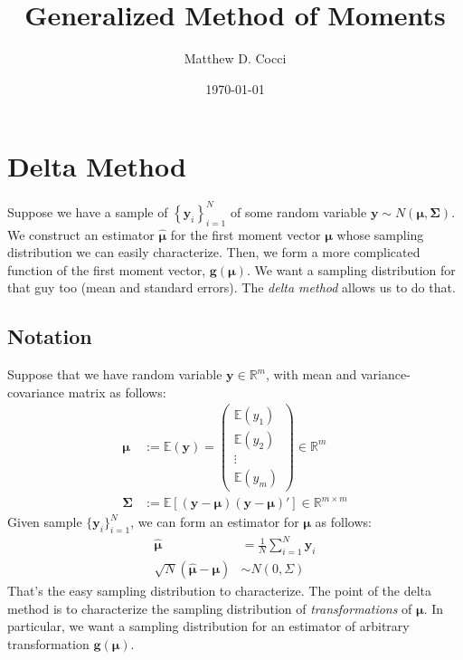 \documentclass[12pt]{article}
\author{Matthew D. Cocci}
\title{Generalized Method of Moments}
\date{\today}
\theoremstyle{plain}
\theoremstyle{definition}
\theoremstyle{remark}
\begin{document}

\maketitle

\tableofcontents %

\clearpage
\section{Delta Method}

Suppose we have a sample of $\left\{\boldsymbol{y}_i\right\}_{i=1}^N$ of
some random variable $\boldsymbol{y}\sim
N(\boldsymbol{\mu},\boldsymbol{\Sigma})$. We construct an estimator
$\boldsymbol{\hat{\mu}}$ for the first moment vector $\boldsymbol{\mu}$
whose sampling distribution we can easily characterize. Then, we form a
more complicated function of the first moment vector,
$\boldsymbol{g}(\boldsymbol{\mu})$.  We want a sampling distribution for
that guy too (mean and standard errors). The \emph{delta method} allows
us to do that.

\subsection{Notation}

Suppose that we have random variable $\boldsymbol{y}\in \mathbb{R}^m$,
with mean and variance-covariance matrix as follows:
\begin{align*}
  \boldsymbol{\mu} &:= \mathbb{E}(\boldsymbol{y}) =
  \begin{pmatrix}
    \mathbb{E}(y_1)\\\mathbb{E}(y_2)\\\vdots\\\mathbb{E}(y_m)
  \end{pmatrix}
  \in \mathbb{R}^m
  \\
  \boldsymbol{\Sigma}
  &:=
  \mathbb{E}\left[
    (\boldsymbol{y}-\boldsymbol{\mu})
    (\boldsymbol{y}-\boldsymbol{\mu})'
  \right]
  \in \mathbb{R}^{m\times m}
\end{align*}
Given sample $\{\boldsymbol{y}_i\}_{i=1}^N$, we can form an estimator
for $\boldsymbol{\mu}$ as follows:
\begin{align*}
  \boldsymbol{\hat{\mu}}
  &=
  \frac{1}{N}
  \sum^N_{i=1}
  \boldsymbol{y}_i\\
  \sqrt{N}(\boldsymbol{\hat{\mu}} - \boldsymbol{\mu})
  &\sim N(0,\Sigma)
\end{align*}
That's the easy sampling distribution to characterize. The point of the
delta method is to characterize the sampling distribution of
\emph{transformations} of $\boldsymbol{\mu}$. In particular, we want a
sampling distribution for an estimator of arbitrary transformation
$\boldsymbol{g}(\boldsymbol{\mu})$.
\end{document}
